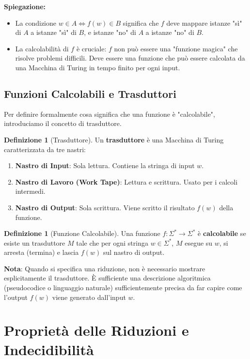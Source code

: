 \documentclass[a4paper]{article}
\theoremstyle{definition} %
\newtheorem{definition}[theorem]{Definizione}
\begin{document}
\textbf{Spiegazione:}
\begin{itemize}
    \item La condizione $w \in A \iff f(w) \in B$ significa che $f$ deve mappare istanze "sì" di $A$ a istanze "sì" di $B$, e istanze "no" di $A$ a istanze "no" di $B$.
    \item La calcolabilità di $f$ è cruciale: $f$ non può essere una "funzione magica" che risolve problemi difficili. Deve essere una funzione che può essere calcolata da una Macchina di Turing in tempo finito per ogni input.
\end{itemize}

\subsection{Funzioni Calcolabili e Trasduttori}

Per definire formalmente cosa significa che una funzione è "calcolabile", introduciamo il concetto di trasduttore.

\begin{definition}[Trasduttore]
Un \textbf{trasduttore} è una Macchina di Turing caratterizzata da tre nastri:
\begin{enumerate}
    \item \textbf{Nastro di Input}: Sola lettura. Contiene la stringa di input $w$.
    \item \textbf{Nastro di Lavoro (Work Tape)}: Lettura e scrittura. Usato per i calcoli intermedi.
    \item \textbf{Nastro di Output}: Sola scrittura. Viene scritto il risultato $f(w)$ della funzione.
\end{enumerate}
\end{definition}

\begin{definition}[Funzione Calcolabile]
Una funzione $f: \Sigma^* \to \Sigma^*$ è \textbf{calcolabile} se esiste un trasduttore $M$ tale che per ogni stringa $w \in \Sigma^*$, $M$ esegue su $w$, si arresta (termina) e lascia $f(w)$ sul nastro di output.
\end{definition}
\textbf{Nota}: Quando si specifica una riduzione, non è necessario mostrare esplicitamente il trasduttore. È sufficiente una descrizione algoritmica (pseudocodice o linguaggio naturale) sufficientemente precisa da far capire come l'output $f(w)$ viene generato dall'input $w$.

\section{Proprietà delle Riduzioni e Indecidibilità}
\end{document}
